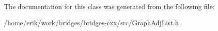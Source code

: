 The documentation for this class was generated from the following file\+:\begin{DoxyCompactItemize}
\item 
/home/erik/work/bridges/bridges-\/cxx/src/\hyperlink{_graph_adj_list_8h}{Graph\+Adj\+List.\+h}\end{DoxyCompactItemize}
